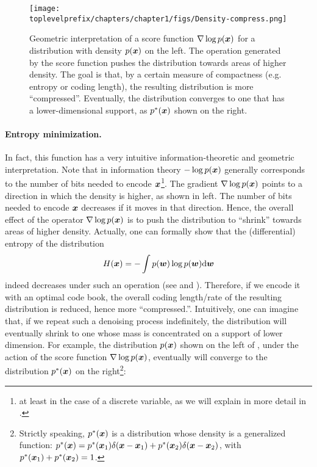 \documentclass[../../book-main.tex]{subfiles}
\begin{document}
\begin{figure}
    \centering
    \texttt{[image: \\toplevelprefix/chapters/chapter1/figs/Density-compress.png]}
    \caption{Geometric interpretation of a score function $\nabla \log p(\bm{x})$ for a distribution with density $p(\bm{x})$ on the left. The operation generated by the score function pushes the distribution towards areas of higher density. The goal is that, by a certain measure of compactness (e.g. entropy or coding length), the resulting distribution is more ``compressed''. Eventually, the distribution converges to one that has a lower-dimensional support, as $p^*(\bm{x})$ shown on the right.}
    \label{fig:score-function}
\end{figure}

\paragraph{Entropy minimization.} In fact, this function has a very intuitive information-theoretic and geometric interpretation. Note that in information theory $-\log p(\bm{x})$ generally corresponds to the number of bits needed to encode $\bm{x}$\footnote{at least in the case of a discrete variable, as we will explain in more detail in .}. The gradient $\nabla \log p(\bm{x})$  points to a direction in which the density is higher, as shown in  left. The number of bits needed to encode $\bm{x}$ decreases if it moves in that direction. Hence, the overall effect of the operator $\nabla \log p(\bm{x})$ is to push the distribution to ``shrink''  towards areas of higher density. Actually, one can formally show that the (differential) entropy of the distribution 
\begin{equation}
H(\bm{x}) = - \int p(\boldsymbol{w}) \log p(\boldsymbol{w}) \mathrm{d}\boldsymbol{w}    \end{equation} 
indeed decreases under such an operation (see  and ). Therefore, if we encode it with an optimal code book, the overall coding length/rate of the resulting distribution is reduced, hence more ``compressed.''. Intuitively, one can imagine that, if we repeat such a denoising process indefinitely, the distribution will eventually shrink to one whose mass is concentrated on a support of lower dimension. For example, the distribution $p(\bm{x})$ shown on the left of , under the action of the score function $\nabla \log p(\bm{x})$, eventually will converge to the distribution $p^*(\bm{x})$ on the right\footnote{Strictly speaking, $p^*(\bm{x})$ is a distribution whose density is a generalized function: $p^*(\bm{x}) = p^*(\bm{x}_1)\delta(\bm{x}-\bm{x}_1) + p^*(\bm{x}_2) \delta(\bm{x}-\bm{x}_2)$, with $p^*(\bm{x}_1) + p^*(\bm{x}_2) = 1$. }:
\end{document}
